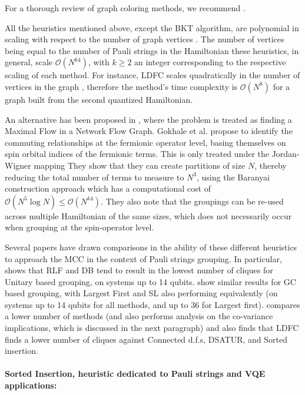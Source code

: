 For a thorough review of graph coloring methods, we recommend \cite{Kubale2004}.

All the heuristics mentioned above, except the BKT algorithm, are polynomial in scaling with respect to the number of graph vertices \cite{Izmaylov2020a}. The number of vertices being equal to the number of Pauli strings in the Hamiltonian these heuristics, in general, scale $\mathcal{O}(N^{k4})$, with $k \geqslant 2$ an integer corresponding to the respective scaling of each method. For instance, LDFC scales quadratically in the number of vertices in the graph \cite{Kubale2004}, therefore the method's time complexity is $\mathcal{O}(N^8)$ for a graph built from the second quantized Hamiltonian.

An alternative has been proposed in \cite{Gokhale2019_short}, where the problem is treated as finding a Maximal Flow in a Network Flow Graph. Gokhale et al. propose to identify the commuting relationships at the fermionic operator level, basing themselves on spin orbital indices of the fermionic terms. This is only treated under the Jordan-Wigner mapping They show that they can create partitions of size $N$, thereby reducing the total number of terms to measure to $N^3$, using the Baranyai construction approach which has a computational cost of $\mathcal{O}(N^5\log N) \leqslant \mathcal{O}(N^{k4})$. They also note that the groupings can be re-used across multiple Hamiltonian of the same sizes, which does not necessarily occur when grouping at the spin-operator level.

Several papers have drawn comparisons in the ability of these different heuristics to approach the MCC in the context of Pauli strings grouping. In particular, \cite{Izmaylov2020a} shows that RLF and DB tend to result in the lowest number of cliques for Unitary based grouping, on systems up to 14 qubits. \cite{Verteletskyi2020} show similar results for GC based grouping, with Largest First and SL also performing equivalently (on systems up to 14 qubits for all methods, and up to 36 for Largest first). \cite{Crawford2021} compares a lower number of methods (and also performs analysis on the co-variance implications, which is discussed in the next paragraph) and also finds that LDFC finds a lower number of cliques against Connected d.f.s, DSATUR, and Sorted insertion. 

\paragraph{Sorted Insertion, heuristic dedicated to Pauli strings and VQE applications:} 

